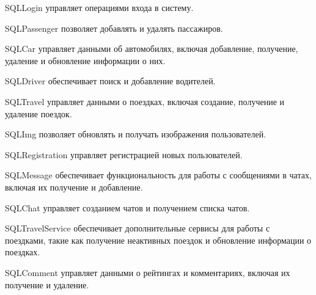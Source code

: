SQLLogin управляет операциями входа в систему.

SQLPassenger позволяет добавлять и удалять пассажиров.

SQLCar управляет данными об автомобилях, включая добавление, получение, удаление и обновление информации о них.

SQLDriver обеспечивает поиск и добавление водителей.

SQLTravel управляет данными о поездках, включая создание, получение и удаление поездок.

SQLImg позволяет обновлять и получать изображения пользователей.

SQLRegistration управляет регистрацией новых пользователей.

SQLMessage обеспечивает функциональность для работы с сообщениями в чатах, включая их получение и добавление.

SQLChat управляет созданием чатов и получением списка чатов.

SQLTravelService обеспечивает дополнительные сервисы для работы с поездками, такие как получение неактивных поездок и обновление информации о поездках.

SQLComment управляет данными о рейтингах и комментариях, включая их получение и удаление.
